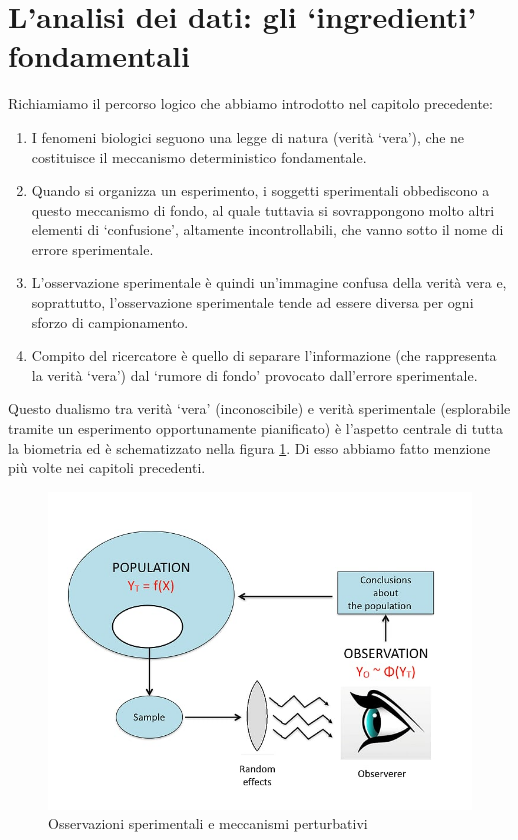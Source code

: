 \documentclass[a4paper,12pt,oneside]{book}
\providecommand{\tightlist}{%
  \setlength{\itemsep}{0pt}\setlength{\parskip}{0pt}}
\begin{document}
\hypertarget{lanalisi-dei-dati-gli-ingredienti-fondamentali}{%
\section{L'analisi dei dati: gli `ingredienti' fondamentali}\label{lanalisi-dei-dati-gli-ingredienti-fondamentali}}

Richiamiamo il percorso logico che abbiamo introdotto nel capitolo precedente:

\begin{enumerate}
\def\labelenumi{\arabic{enumi}.}
\tightlist
\item
  I fenomeni biologici seguono una legge di natura (verità `vera'), che ne costituisce il meccanismo deterministico fondamentale.
\item
  Quando si organizza un esperimento, i soggetti sperimentali obbediscono a questo meccanismo di fondo, al quale tuttavia si sovrappongono molto altri elementi di `confusione', altamente incontrollabili, che vanno sotto il nome di errore sperimentale.
\item
  L'osservazione sperimentale è quindi un'immagine confusa della verità vera e, soprattutto, l'osservazione sperimentale tende ad essere diversa per ogni sforzo di campionamento.
\item
  Compito del ricercatore è quello di separare l'informazione (che rappresenta la verità `vera') dal `rumore di fondo' provocato dall'errore sperimentale.
\end{enumerate}

Questo dualismo tra verità `vera' (inconoscibile) e verità sperimentale (esplorabile tramite un esperimento opportunamente pianificato) è l'aspetto centrale di tutta la biometria ed è schematizzato nella figura \ref{fig:figName61}. Di esso abbiamo fatto menzione più volte nei capitoli precedenti.

\begin{figure}

{\centering \includegraphics[width=0.75\linewidth]{_images/InferenceProcess} 

}

\caption{Osservazioni sperimentali e meccanismi perturbativi}\label{fig:figName61}
\end{figure}
\end{document}
